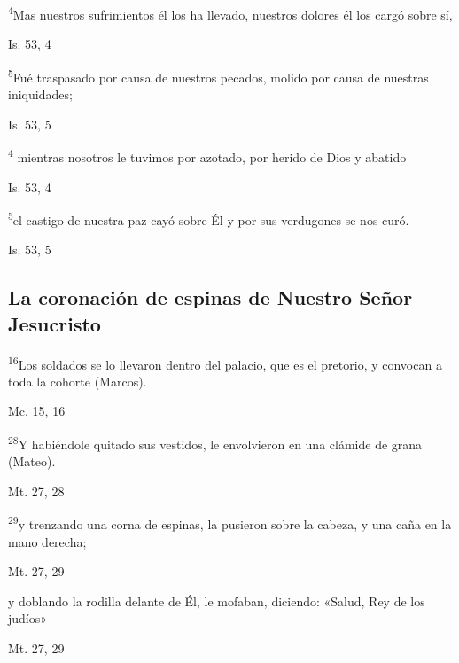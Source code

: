 \documentclass[a4paper,11pt]{article}
\begin{document}
      \textsuperscript{4}Mas nuestros sufrimientos él los ha llevado, nuestros dolores él los cargó sobre sí,
      \begin{flushright}
        Is. 53, 4
      \end{flushright}

      \textsuperscript{5}Fué traspasado por causa de nuestros pecados, molido por causa de nuestras iniquidades; 
      \begin{flushright}
        Is. 53, 5
      \end{flushright}

      \textsuperscript{4} mientras nosotros le tuvimos por azotado, por herido de Dios y abatido
      \begin{flushright}
        Is. 53, 4 
      \end{flushright}

      \textsuperscript{5}el castigo de nuestra paz cayó sobre Él y por sus verdugones se nos curó.
      \begin{flushright}
        Is. 53, 5
      \end{flushright}
      
    \subsection*{\hfil La coronación de espinas de Nuestro Señor Jesucristo \hfil}
      
      \textsuperscript{16}Los soldados se lo llevaron dentro del palacio, que es el pretorio, y convocan a toda la cohorte (Marcos).
      \begin{flushright}
        Mc. 15, 16
      \end{flushright}
      \textsuperscript{28}Y habiéndole quitado sus vestidos, le envolvieron en una clámide de grana (Mateo).
      \begin{flushright}
        Mt. 27, 28
      \end{flushright}

      \textsuperscript{29}y trenzando una corna de espinas, la pusieron sobre la cabeza, y una caña en la mano derecha; 
      \begin{flushright}
        Mt. 27, 29
      \end{flushright}

      y doblando la rodilla delante de Él, le mofaban, diciendo: «Salud, Rey de los judíos»
      \begin{flushright}
        Mt. 27, 29
      \end{flushright}
\end{document}
